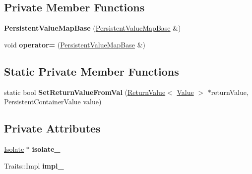 \subsection*{Private Member Functions}
\begin{DoxyCompactItemize}
\item 
{\bfseries Persistent\+Value\+Map\+Base} (\hyperlink{classv8_1_1_persistent_value_map_base}{Persistent\+Value\+Map\+Base} \&)\hypertarget{classv8_1_1_persistent_value_map_base_af083c2f017cdbd5d11cc26cefd62ee89}{}\label{classv8_1_1_persistent_value_map_base_af083c2f017cdbd5d11cc26cefd62ee89}

\item 
void {\bfseries operator=} (\hyperlink{classv8_1_1_persistent_value_map_base}{Persistent\+Value\+Map\+Base} \&)\hypertarget{classv8_1_1_persistent_value_map_base_ae18eeb1c509804447ddb6dbe18463259}{}\label{classv8_1_1_persistent_value_map_base_ae18eeb1c509804447ddb6dbe18463259}

\end{DoxyCompactItemize}
\subsection*{Static Private Member Functions}
\begin{DoxyCompactItemize}
\item 
static bool {\bfseries Set\+Return\+Value\+From\+Val} (\hyperlink{classv8_1_1_return_value}{Return\+Value}$<$ \hyperlink{classv8_1_1_value}{Value} $>$ $\ast$return\+Value, Persistent\+Container\+Value value)\hypertarget{classv8_1_1_persistent_value_map_base_ade3df16080e354eb430edc1a45e05007}{}\label{classv8_1_1_persistent_value_map_base_ade3df16080e354eb430edc1a45e05007}

\end{DoxyCompactItemize}
\subsection*{Private Attributes}
\begin{DoxyCompactItemize}
\item 
\hyperlink{classv8_1_1_isolate}{Isolate} $\ast$ {\bfseries isolate\+\_\+}\hypertarget{classv8_1_1_persistent_value_map_base_ade71227119d310117c0aefdea1c03ba5}{}\label{classv8_1_1_persistent_value_map_base_ade71227119d310117c0aefdea1c03ba5}

\item 
Traits\+::\+Impl {\bfseries impl\+\_\+}\hypertarget{classv8_1_1_persistent_value_map_base_ab72a180bc12ace83c2b29b711476bf6a}{}\label{classv8_1_1_persistent_value_map_base_ab72a180bc12ace83c2b29b711476bf6a}

\end{DoxyCompactItemize}


